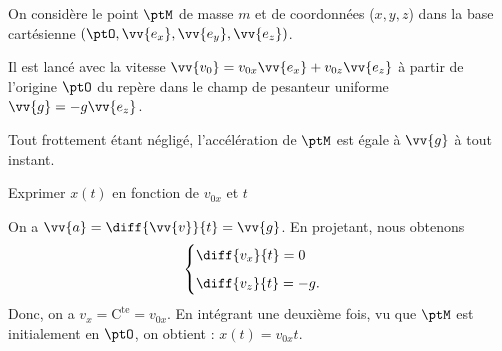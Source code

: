 
\hauteurLargeurCadreReponse		{8mm}{4cm}
\initialisationEntrainement



On considère le point $\ptM$ de masse $m$ et de coordonnées ($x,y,z$) dans 
la base cartésienne $(\ptO,\vv{e_x},\vv{e_y},\vv{e_z})$. 

Il est lancé avec la 
vitesse $\vv{v_0} = v_{0x}\vv{e_x} + v_{0z}\vv{e_z}$ à partir de l'origine $\ptO$ du repère dans le champ de pesanteur uniforme $\vv{g} = -g\vv{e_z}$.

Tout frottement étant négligé, l'accélération de $\ptM$ est égale à $\vv{g}$ à tout instant. 


\debutEntrainement



\begin{enonce}
	Exprimer $x(t)$ en fonction de $v_{0x}$ et $t$
\end{enonce}

	
\begin{corrigeNewpage}
 On a $\vv{a} = 
	\diff{\vv{v}}{t} = \vv{g}$.
	En projetant, nous obtenons 
	\[
	\begin{cases}
		\diff{v_x}{t} = 0\\[2mm]
		\diff{v_z}{t} = -g.
	\end{cases}
	\]
Donc, on a $v_x = \mathrm{C^{te}}=v_{0x}$. En intégrant une deuxième fois,  vu que $\ptM$ 
est initialement en $\ptO$, on obtient : $x(t) = v_{0x}t$.
\end{corrigeNewpage}

